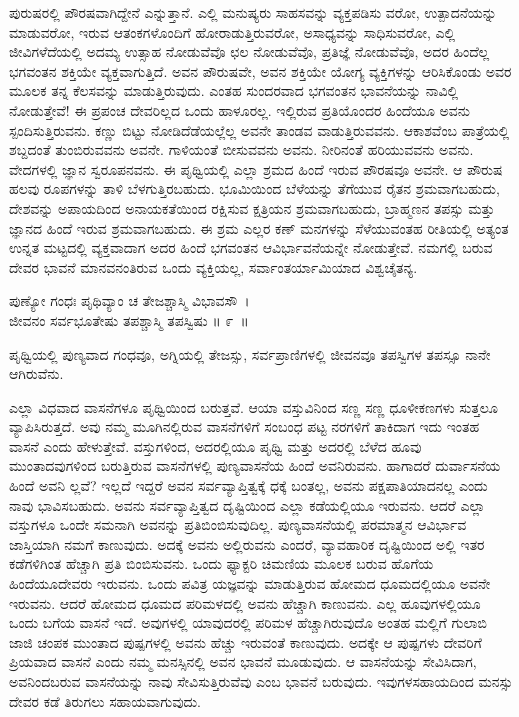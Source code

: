 ಪುರುಷರಲ್ಲಿ ಪೌರಷವಾಗಿದ್ದೇನೆ ಎನ್ನುತ್ತಾನೆ. ಎಲ್ಲಿ ಮನುಷ್ಯರು ಸಾಹಸವನ್ನು ವ್ಯಕ್ತಪಡಿಸು ವರೋ, ಉತ್ಪಾದನೆಯನ್ನು ಮಾಡುವರೋ, ಇರುವ ಆತಂಕಗಳೊಂದಿಗೆ ಹೋರಾಡುತ್ತಿರುವರೋ, ಅಸಾಧ್ಯವನ್ನು ಸಾಧಿಸುವರೋ, ಎಲ್ಲಿ ಜೀವಿಗಳೆದೆಯಲ್ಲಿ ಅದಮ್ಯ ಉತ್ಸಾಹ ನೋಡುವೆವೊ ಛಲ ನೋಡುವೆವೊ, ಪ್ರತಿಜ್ಞೆ ನೋಡುವೆವೊ, ಅದರ ಹಿಂದೆಲ್ಲ ಭಗವಂತನ ಶಕ್ತಿಯೇ ವ್ಯಕ್ತವಾಗುತ್ತಿದೆ. ಅವನ ಪೌರುಷವೇ, ಅವನ ಶಕ್ತಿಯೇ ಯೋಗ್ಯ ವ್ಯಕ್ತಿಗಳನ್ನು ಆರಿಸಿಕೊಂಡು ಅವರ ಮೂಲಕ ತನ್ನ ಕೆಲಸವನ್ನು ಮಾಡುತ್ತಿರುವುದು. ಎಂತಹ ಸುಂದರವಾದ ಭಗವಂತನ ಭಾವನೆಯನ್ನು ನಾವಿಲ್ಲಿ ನೋಡುತ್ತೇವೆ! ಈ ಪ್ರಪಂಚ ದೇವರಿಲ್ಲದ ಒಂದು ಹಾಳೂರಲ್ಲ. ಇಲ್ಲಿರುವ ಪ್ರತಿಯೊಂದರ ಹಿಂದೆಯೂ ಅವನು ಸ್ಪಂದಿಸುತ್ತಿರುವನು. ಕಣ್ಣು ಬಿಟ್ಟು ನೋಡಿದೆಡೆಯಲ್ಲೆಲ್ಲ ಅವನೇ ತಾಂಡವ ವಾಡುತ್ತಿರುವವನು. ಆಕಾಶವೆಂಬ ಪಾತ್ರೆಯಲ್ಲಿ ಶಬ್ದದಂತೆ ತುಂಬಿರುವವನು ಅವನೇ. ಗಾಳಿಯಂತೆ ಬೀಸುವವನು ಅವನು. ನೀರಿನಂತೆ ಹರಿಯುವವನು ಅವನು. ವೇದಗಳಲ್ಲಿ ಜ್ಞಾನ ಸ್ವರೂಪನವನು. ಈ ಪೃಥ್ವಿಯಲ್ಲಿ ಎಲ್ಲಾ ಶ್ರಮದ ಹಿಂದೆ ಇರುವ ಪೌರಷವೂ ಅವನೇ. ಆ ಪೌರುಷ ಹಲವು ರೂಪಗಳನ್ನು ತಾಳಿ ಬೆಳಗುತ್ತಿರಬಹುದು. ಭೂಮಿಯಿಂದ ಬೆಳೆಯನ್ನು ತೆಗೆಯುವ ರೈತನ ಶ್ರಮವಾಗಬಹುದು, ದೇಶವನ್ನು ಅಪಾಯದಿಂದ ಅನಾಯಕತೆಯಿಂದ ರಕ್ಷಿಸುವ ಕ್ಷತ್ರಿಯನ ಶ್ರಮವಾಗಬಹುದು, ಬ್ರಾಹ್ಮಣನ ತಪಸ್ಸು ಮತ್ತು ಜ್ಞಾನದ ಹಿಂದೆ ಇರುವ ಶ್ರಮವಾಗಬಹುದು. ಈ ಶ್ರಮ ಎಲ್ಲರ ಕಣ್ ಮನಗಳನ್ನು ಸೆಳೆಯುವಂತಹ ರೀತಿಯಲ್ಲಿ ಅತ್ಯಂತ ಉನ್ನತ ಮಟ್ಟದಲ್ಲಿ ವ್ಯಕ್ತ\-ವಾದಾಗ ಅದರ ಹಿಂದೆ ಭಗವಂತನ ಆವಿರ್ಭಾವನೆಯನ್ನೇ ನೋಡುತ್ತೇವೆ. ನಮಗಲ್ಲಿ ಬರುವ ದೇವರ ಭಾವನೆ ಮಾನವನಂತಿರುವ ಒಂದು ವ್ಯಕ್ತಿಯಲ್ಲ, ಸರ್ವಾಂತರ್ಯಾಮಿಯಾದ ವಿಶ್ವಚೈತನ್ಯ.

\begin{shloka}
ಪುಣ್ಯೋ ಗಂಧಃ ಪೃಥಿವ್ಯಾಂ ಚ ತೇಜಶ್ಚಾಸ್ಮಿ ವಿಭಾವಸೌ~।\\ಜೀವನಂ ಸರ್ವಭೂತೇಷು ತಪಶ್ಚಾಸ್ಮಿ ತಪಸ್ವಿಷು \hfill॥ ೯~॥
\end{shloka}

\begin{artha}
ಪೃಥ್ವಿಯಲ್ಲಿ ಪುಣ್ಯವಾದ ಗಂಧವೂ, ಅಗ್ನಿಯಲ್ಲಿ ತೇಜಸ್ಸು, ಸರ್ವಪ್ರಾಣಿಗಳಲ್ಲಿ ಜೀವನವೂ ತಪಸ್ವಿಗಳ ತಪಸ್ಸೂ ನಾನೇ ಆಗಿರುವೆನು. 
\end{artha}

ಎಲ್ಲಾ ವಿಧವಾದ ವಾಸನೆಗಳೂ ಪೃಥ್ವಿಯಿಂದ ಬರುತ್ತವೆ. ಆಯಾ ವಸ್ತುವಿನಿಂದ ಸಣ್ಣ ಸಣ್ಣ ಧೂಳೀಕಣಗಳು ಸುತ್ತಲೂ ವ್ಯಾಪಿಸಿರುತ್ತದೆ. ಅವು ನಮ್ಮ ಮೂಗಿನಲ್ಲಿರುವ ವಾಸನೆಗಳಿಗೆ ಸಂಬಂಧ ಪಟ್ಟ ನರಗಳಿಗೆ ತಾಕಿದಾಗ ಇದು ಇಂತಹ ವಾಸನೆ ಎಂದು ಹೇಳುತ್ತೇವೆ. ವಸ್ತುಗಳಿಂದ, ಅದರಲ್ಲಿಯೂ ಪೃಥ್ವಿ ಮತ್ತು ಅದರಲ್ಲಿ ಬೆಳೆದ ಹೂವು ಮುಂತಾದವುಗಳಿಂದ ಬರುತ್ತಿರುವ ವಾಸನೆಗಳಲ್ಲಿ ಪುಣ್ಯವಾಸನೆಯ ಹಿಂದೆ ಅವನಿರುವನು. ಹಾಗಾದರೆ ದುರ್ವಾಸನೆಯ ಹಿಂದೆ ಅವನಿ ಲ್ಲವೆ? ಇಲ್ಲದೆ ಇದ್ದರೆ ಅವನ ಸರ್ವವ್ಯಾಪ್ತಿತ್ವಕ್ಕೆ ಧಕ್ಕೆ ಬಂತಲ್ಲ, ಅವನು ಪಕ್ಷಪಾತಿಯಾದನಲ್ಲ ಎಂದು ನಾವು ಭಾವಿಸಬಹುದು. ಅವನು ಸರ್ವವ್ಯಾಪ್ತಿತ್ವದ ದೃಷ್ಟಿಯಿಂದ ಎಲ್ಲಾ ಕಡೆಯಲ್ಲಿಯೂ ಇರುವನು. ಆದರೆ ಎಲ್ಲಾ ವಸ್ತುಗಳೂ ಒಂದೇ ಸಮನಾಗಿ ಅವನನ್ನು ಪ್ರತಿಬಿಂಬಿಸುವುದಿಲ್ಲ. ಪುಣ್ಯವಾಸನೆಯಲ್ಲಿ ಪರಮಾತ್ಮನ ಆವಿರ್ಭಾವ ಜಾಸ್ತಿಯಾಗಿ ನಮಗೆ ಕಾಣುವುದು. ಅದಕ್ಕೆ ಅವನು ಅಲ್ಲಿರುವನು ಎಂದರೆ, ವ್ಯಾವಹಾರಿಕ ದೃಷ್ಟಿಯಿಂದ ಅಲ್ಲಿ ಇತರ ಕಡೆಗಳಿಗಿಂತ ಹೆಚ್ಚಾಗಿ ಪ್ರತಿ ಬಿಂಬಿಸುವನು. ಒಂದು ಫ್ಯಾಕ್ಟರಿ ಚಿಮಣಿಯ ಮೂಲಕ ಬರುವ ಹೊಗೆಯ ಹಿಂದೆಯೂ\break ದೇವರು ಇರುವನು. ಒಂದು ಪವಿತ್ರ ಯಜ್ಞವನ್ನು ಮಾಡುತ್ತಿರುವ ಹೋಮದ ಧೂಮದಲ್ಲಿಯೂ ಅವನೇ ಇರುವನು. ಆದರೆ ಹೋಮದ ಧೂಮದ ಪರಿಮಳದಲ್ಲಿ ಅವನು ಹೆಚ್ಚಾಗಿ ಕಾಣುವನು. ಎಲ್ಲ ಹೂವುಗಳಲ್ಲಿಯೂ ಒಂದು ಬಗೆಯ ವಾಸನೆ ಇದೆ. ಅವುಗಳಲ್ಲಿ ಯಾವುದರಲ್ಲಿ ಪರಿಮಳ ಹೆಚ್ಚಾಗಿರುವುದೊ ಅಂತಹ ಮಲ್ಲಿಗೆ ಗುಲಾಬಿ ಜಾಜಿ ಚಂಪಕ ಮುಂತಾದ ಪುಷ್ಪಗಳಲ್ಲಿ ಅವನು ಹೆಚ್ಚು ಇರುವಂತೆ ಕಾಣುವುದು. ಅದಕ್ಕೇ ಆ ಪುಷ್ಪಗಳು ದೇವರಿಗೆ ಪ್ರಿಯವಾದ ವಾಸನೆ ಎಂದು ನಮ್ಮ ಮನಸ್ಸಿನಲ್ಲಿ ಅವನ ಭಾವನೆ ಮೂಡುವುದು. ಆ ವಾಸನೆಯನ್ನು ಸೇವಿಸಿದಾಗ, ಅವನಿಂದ\break ಬರುವ ವಾಸನೆಯನ್ನು ನಾವು ಸೇವಿಸುತ್ತಿರುವೆವು ಎಂಬ ಭಾವನೆ ಬರುವುದು. ಇವುಗಳ\break ಸಹಾಯದಿಂದ ಮನಸ್ಸು ದೇವರ ಕಡೆ ತಿರುಗಲು ಸಹಾಯವಾಗುವುದು.

